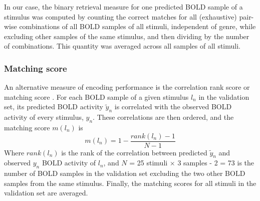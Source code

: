 In our case, the binary retrieval measure for one predicted BOLD sample of a stimulus was computed by counting the correct matches for all (exhaustive) pair-wise combinations of all BOLD samples of all stimuli, independent of genre, while excluding other samples of the same stimulus, and then dividing by the number of combinations. This quantity was averaged across all samples of all stimuli.

\subsubsection*{Matching score}
%
An alternative measure of encoding performance is the correlation rank score or matching score \citep{SF14}. For each BOLD sample of a given stimulus $l_{n}$ in the validation set, its predicted BOLD activity $\widetilde{y}_{n}$ is correlated with the observed BOLD activity of every stimulus, $y_{n}$.
These correlations are then ordered, and the  matching score $m(l_{n})$ is \[m(l_{n}) = 1-\frac{rank(l_{n})-1}{N-1} \] Where $rank(l_{n})$ is the rank of the correlation between predicted $\widetilde{y}_{n}$ and observed $y_{n}$ BOLD activity of $l_{n}$, and $N$ = 25 stimuli $\times$ 3 samples - 2 = 73 is the number of BOLD samples in the validation set excluding the two other BOLD samples from the same stimulus.
Finally, the matching scores for all stimuli in the validation set are averaged.


